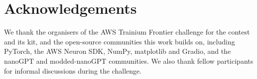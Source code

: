 \section*{Acknowledgements}

We thank the organisers of the AWS Trainium Frontier challenge for the contest and its kit, and the open-source
communities this work builds on, including PyTorch, the AWS Neuron SDK, NumPy, matplotlib and Gradio, and the nanoGPT
and modded-nanoGPT communities. We also thank fellow participants for informal discussions during the challenge.
\fi
